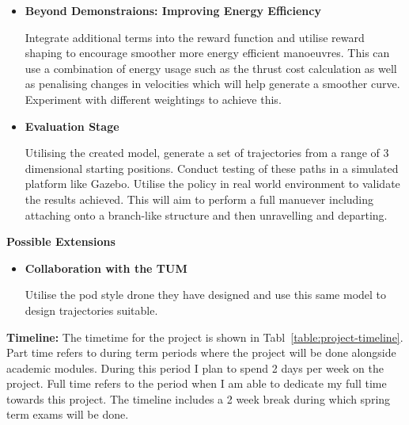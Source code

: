 \begin{itemize}
  \item \textbf{Beyond Demonstraions: Improving Energy Efficiency}
  
  Integrate additional terms into the reward function and utilise reward shaping to encourage smoother more energy efficient manoeuvres.
  This can use a combination of energy usage such as the thrust cost calculation as well as penalising changes in velocities which will help generate a smoother curve.
  Experiment with different weightings to achieve this.

  \item \textbf{Evaluation Stage}
  
  Utilising the created model, generate a set of trajectories from a range of 3 dimensional starting positions.
  Conduct testing of these paths in a simulated platform like Gazebo.
  Utilise the policy in real world environment to validate the results achieved.
  This will aim to perform a full manuever including attaching onto a branch-like structure and then unravelling and departing.

\end{itemize}

\textbf{Possible Extensions}
\begin{itemize}
  \item \textbf{Collaboration with the TUM}
  
  Utilise the pod style drone they have designed and use this same model to design trajectories suitable.
\end{itemize}

\textbf{Timeline:}
The timetime for the project is shown in Tabl~\ref{table:project-timeline}.
Part time refers to during term periods where the project will be done alongside academic modules.
During this period I plan to spend 2 days per week on the project.
Full time refers to the period when I am able to dedicate my full time towards this project.
The timeline includes a 2 week break during which spring term exams will be done.

